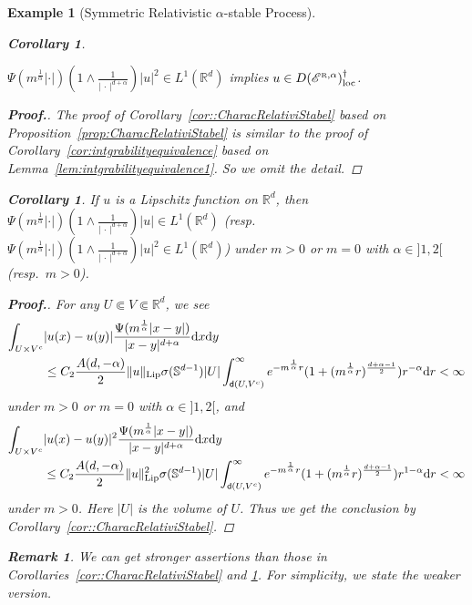 \documentclass[12pt,a4paper]{article}
\newtheorem{cor}[thm]{Corollary}
\newtheorem{remark}[thm]{Remark}
\newtheorem{example}[thm]{Example}
\newcommand{\R}{\mathbb{R}}
\renewcommand{\d}{\mathrm{d}}
\newcommand{\loc}{{\rm loc}}
\newcommand{\1}{{\bf 1}}
\begin{document}
\begin{example}[Symmetric Relativistic $\alpha$-stable Process]
\begin{cor}
\begin{enumerate}
$\Psi(m^{\frac{1}{\alpha}}|\cdot|)\left(1\land\frac{1}{
|\,\cdot\,|^{d+\alpha}} \right)|u|^2\in L^1(\R^d)$  implies $u\in D(\mathscr{E}^{\text{\tiny\rm R},\alpha})^{\dag}_{\loc}$.
\end{enumerate}
\end{cor}
\begin{proof}[{\bf Proof.}]
The proof of Corollary~\ref{cor::CharacRelativiStabel} based on 
Proposition~\ref{prop:CharacRelativiStabel} 
 is similar to 
the proof of Corollary~\ref{cor:intgrabilityequivalence} based on Lemma~\ref{lem:intgrabilityequivalence1}. So we omit the detail. 
\end{proof}
\begin{cor}\label{cor:Lipschitz}
If $u$ is a Lipschitz function on $\R^d$, then $\Psi(m^{\frac{1}{\alpha}}
|\cdot|)\left(1\land\frac{1}{|\,\cdot\,|^{d+\alpha}}\right)|u|\in L^1(\R^d)$ {\rm(}resp.~$\Psi(m^{\frac{1}{\alpha}}|\cdot|)\left(1\land\frac{1}{|\,\cdot\,|^{d+\alpha}}\right)|u|^2\in L^1(\R^d)${\rm)} under $m>0$ or 
$m=0$ with $\alpha\in]1,2[$ {\rm(}resp.~$m>0${\rm)}. 
\end{cor}
\begin{proof}[{\bf Proof.}]
For any $U\Subset V\Subset \R^d$, we see 
\begin{align*}
\int_{U\times V^c}&|u(x)-u(y)|\frac{\Psi(m^{\frac{1}{\alpha}}|x-y|)}{|x-y|^{d+\alpha}}{\d} x{\d} y\\
&\leq C_2\frac{A(d,-\alpha)}{2}\|u\|_{\rm Lip}\sigma(\mathbb{S}^{d-1})|U|\int_{{\sf d}(U,V^c)}^{\infty}
e^{-m^{\frac{1}{\alpha}}r}(1+(m^{\frac{1}{\alpha}}r)^{\frac{d+\alpha-1}{2}})r^{-\alpha}{\d} r<\infty
\end{align*}
under $m>0$ or $m=0$ with $\alpha\in]1,2[$, 
and
\begin{align*}
\int_{U\times V^c}&|u(x)-u(y)|^2\frac{\Psi(m^{\frac{1}{\alpha}}|x-y|)}{|x-y|^{d+\alpha}}{\d} x{\d} y\\
&\leq C_2\frac{A(d,-\alpha)}{2}\|u\|_{\rm Lip}^2\sigma(\mathbb{S}^{d-1})|U|\int_{{\sf d}(U,V^c)}^{\infty}
e^{-m^{\frac{1}{\alpha}}r}(1+(m^{\frac{1}{\alpha}}r)^{\frac{d+\alpha-1}{2}})r^{1-\alpha}{\d} r<\infty
\end{align*}
under $m>0$. 
Here $|U|$ is the volume of $U$. 
Thus we get the conclusion by 
Corollary~\ref{cor::CharacRelativiStabel}.
\end{proof}
\begin{remark}
{\rm We can get stronger assertions than those in Corollaries~\ref{cor::CharacRelativiStabel} and \ref{cor:Lipschitz}. 
For simplicity, we state the weaker version. 
}

\end{remark}
\end{example}
\end{document}
